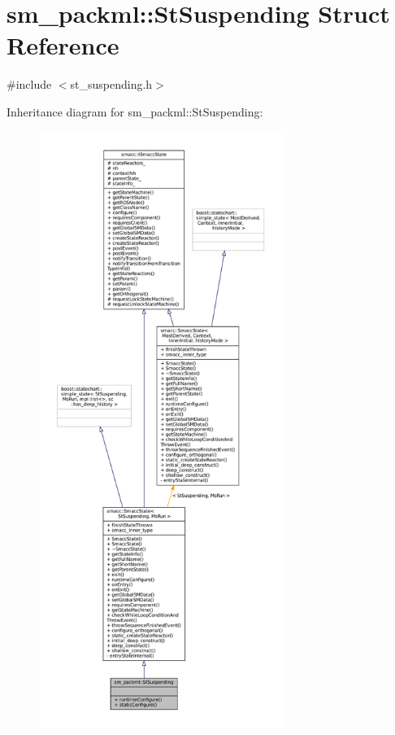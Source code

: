 \hypertarget{structsm__packml_1_1StSuspending}{}\section{sm\+\_\+packml\+:\+:St\+Suspending Struct Reference}
\label{structsm__packml_1_1StSuspending}


{\ttfamily \#include $<$st\+\_\+suspending.\+h$>$}



Inheritance diagram for sm\+\_\+packml\+:\+:St\+Suspending\+:
\nopagebreak
\begin{figure}[H]
\begin{center}
\leavevmode
\includegraphics[height=550pt]{structsm__packml_1_1StSuspending__inherit__graph}
\end{center}
\end{figure}


